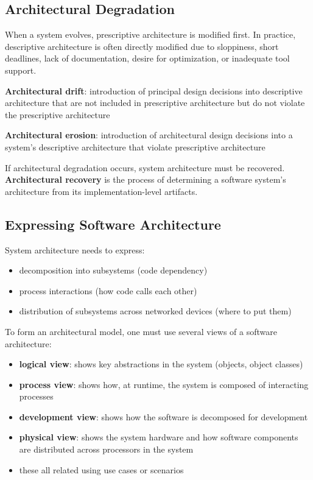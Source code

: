 \documentclass[11pt]{article}
\begin{document}
\subsection{Architectural Degradation}
\label{sec:orgbd5f7ad}

When a system evolves, prescriptive architecture is modified first. In practice, descriptive architecture is often directly modified due to sloppiness, short deadlines, lack of documentation, desire for optimization, or inadequate tool support.

\textbf{Architectural drift}: introduction of principal design decisions into descriptive architecture that are not included in prescriptive architecture but do not violate the prescriptive architecture

\textbf{Architectural erosion}: introduction of architectural design decisions into a system's descriptive architecture that violate prescriptive architecture

If architectural degradation occurs, system architecture must be recovered.
\textbf{Architectural recovery} is the process of determining a software system's architecture from its implementation-level artifacts.
\subsection{Expressing Software Architecture}
\label{sec:org1421cb7}

System architecture needs to express:
\begin{itemize}
\item decomposition into subsystems (code dependency)
\item process interactions (how code calls each other)
\item distribution of subsystems across networked devices (where to put them)
\end{itemize}

To form an architectural model, one must use several views of a software architecture:
\begin{itemize}
\item \textbf{logical view}: shows key abstractions in the system (objects, object classes)
\item \textbf{process view}: shows how, at runtime, the system is composed of interacting processes
\item \textbf{development view}: shows how the software is decomposed for development
\item \textbf{physical view}: shows the system hardware and how software components are distributed across processors in the system
\item these all related using use cases or scenarios
\end{itemize}
\end{document}
